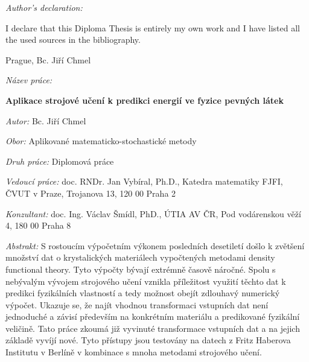 \documentclass[11pt,oneside,czech,american]{book} %
\theoremstyle{definition} %
\theoremstyle{definition}
\begin{document}
\noindent \emph{\Large{}Author's declaration:}{\Large \par}

\noindent I declare that this Diploma Thesis is entirely
my own work and I have listed all the used sources in the bibliography.

\bigskip{}


\noindent Prague, \documentdate \hfill{}Bc. Jiří Chmel

\vspace{2cm}

\newpage{}


%
\begin{onehalfspace}
	\noindent \emph{Název práce:}
	
	\noindent \textbf{Aplikace strojové učení k predikci energií ve fyzice pevných látek}
\end{onehalfspace}

\bigskip{}

\noindent \emph{Autor:} Bc. Jiří Chmel

\bigskip{}

\noindent \emph{Obor:} Aplikované matematicko-stochastické metody\bigskip{}



\noindent \emph{Druh práce:} Diplomová práce

\bigskip{}

\noindent \emph{Vedoucí práce:} doc. RNDr. Jan Vybíral, Ph.D., Katedra matematiky FJFI, ČVUT v Praze, Trojanova 13, 120 00 Praha 2

\bigskip{}

\noindent \emph{Konzultant:} doc. Ing. Václav Šmídl, PhD., ÚTIA AV ČR, Pod vodárenskou věží 4, 180 00 Praha 8

\bigskip{}

\noindent \emph{Abstrakt:} S rostoucím výpočetním výkonem posledních desetiletí došlo k zvětšení množství dat o krystalických materiálech vypočtených metodami density functional theory. Tyto výpočty bývají extrémně časově náročné. Spolu s nebývalým vývojem strojového učení vznikla příležitost využití těchto dat k predikci fyzikálních vlastností a tedy možnost obejít zdlouhavý numerický výpočet. Ukazuje se, že najít vhodnou transformaci vstupních dat není jednoduché a závisí především na konkrétním materiálu a predikované fyzikální veličině. Tato práce zkoumá již vyvinuté transformace vstupních dat a na jejich základě vyvíjí nové. Tyto přístupy jsou testovány na datech z Fritz Haberova Institutu v Berlíně v kombinace s mnoha metodami strojového učení.
\end{document}

